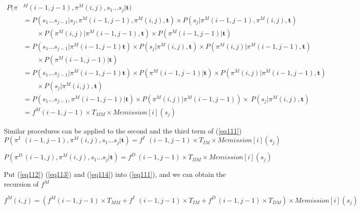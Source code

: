 \documentclass[10pt]{article}
\begin{document}
    
    \begin{equation} \label{eq112}
    \begin{aligned}
      P(\pi&^M(i-1, j-1), \pi^M(i, j), s_1...s_j | \mathbf{t}) \\
        & = P(s_1...s_{j-1} | s_j, \pi^M(i-1, j-1), \pi^M(i, j), \mathbf{t}) \times P(s_j | \pi^M(i-1, j-1), \pi^M(i, j), \mathbf{t}) \\
          &\qquad \times P(\pi^M(i, j) | \pi^M(i-1, j-1), \mathbf{t}) \times P(\pi^M(i-1, j-1) | \mathbf{t}) \\
        & = P(s_1...s_{j-1} | \pi^M(i-1, j-1) \mathbf{t}) \times P(s_j | \pi^M(i, j), \mathbf{t}) \times P(\pi^M(i, j) | \pi^M(i-1, j-1), \mathbf{t})\\
          &\qquad \times P(\pi^M(i-1, j-1) | \mathbf{t}) \\
        & = P(s_1...s_{j-1} | \pi^M(i-1, j-1) \mathbf{t}) \times P(\pi^M(i-1, j-1) | \mathbf{t}) \times P(\pi^M(i, j) | \pi^M(i-1, j-1), \mathbf{t}) \\
          &\qquad \times P(s_j | \pi^M(i, j), \mathbf{t}) \\
        & = P(s_1...s_{j-1}, \pi^M(i-1, j-1) | \mathbf{t}) \times P(\pi^M(i, j) | \pi^M(i-1, j-1)) \times\ 
        P(s_j | \pi^M(i, j), \mathbf{t}) \\
        & = f^{M}(i-1, j-1) \times T_{MM} \times Memission[i](s_j)
    \end{aligned}
    \end{equation}

    Similar procedures can be applied to the second and the third term of (\ref{eq111})
    \begin{equation} \label{eq113}
      P(\pi^{I\;\;}(i-1, j-1), \pi^M(i, j), s_1...s_j | \mathbf{t}) = f^{I\;\;}(i-1, j-1) \times T_{IM} \times Memission[i](s_j)
    \end{equation}

    \begin{equation} \label{eq114}
      P(\pi^{D\;}(i-1, j), \pi^M(i, j), s_1...s_j | \mathbf{t}) = f^{D\;}(i-1, j-1) \times T_{DM} \times Memission[i](s_j)
    \end{equation}
    
    Put (\ref{eq112}) (\ref{eq113}) and (\ref{eq114}) into (\ref{eq111}), and we can obtain the recursion of $f^{M}$
    
    \begin{equation}
      f^{M}(i, j) = (f^{M}(i-1, j-1) \times T_{MM}  + f^{I\;\;}(i-1, j-1) \times T_{IM} + f^{D\;}(i-1, j-1) \times T_{DM}) \times Memission[i](s_j)
    \end{equation}
\end{document}
